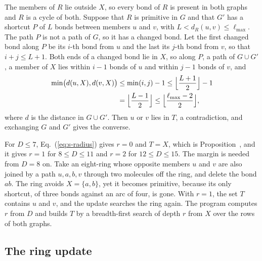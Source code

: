 \documentclass[preprint,12pt]{elsarticle}
\begin{document}
\begin{pf}
The members of $R$ lie outside $X$, so every bond of $R$ is present in both graphs and $R$ is a cycle of both.
Suppose that $R$ is primitive in $G$ and that $G'$ has a shortcut $P$ of $L$ bonds between members $u$ and $v$, with $L<d_R(u,v)\le\ell_{\max}$.
The path $P$ is not a path of $G$, so it has a changed bond.
Let the first changed bond along $P$ be its $i$-th bond from $u$ and the last its $j$-th bond from $v$, so that $i+j\le L+1$.
Both ends of a changed bond lie in $X$, so along $P$, a path of $G\cup G'$, a member of $X$ lies within $i-1$ bonds of $u$ and within $j-1$ bonds of $v$, and
\begin{equation*}
  \begin{aligned}
    \min\bigl(d(u,X),d(v,X)\bigr)&\le\min(i,j)-1\le\Bigl\lfloor\frac{L+1}{2}\Bigr\rfloor-1\\
    &=\Bigl\lfloor\frac{L-1}{2}\Bigr\rfloor\le\Bigl\lfloor\frac{\ell_{\max}-2}{2}\Bigr\rfloor,
  \end{aligned}
\end{equation*}
where $d$ is the distance in $G\cup G'$.
Then $u$ or $v$ lies in $T$, a contradiction, and exchanging $G$ and $G'$ gives the converse.
\end{pf}

For $D\le 7$, Eq.~(\ref{eq:s-radius}) gives $r=0$ and $T=X$, which is Proposition~, and it gives $r=1$ for $8\le D\le 11$ and $r=2$ for $12\le D\le 15$.
The margin is needed from $D=8$ on.
Take an eight-ring whose opposite members $u$ and $v$ are also joined by a path $u,a,b,v$ through two molecules off the ring, and delete the bond $ab$.
The ring avoids $X=\{a,b\}$, yet it becomes primitive, because its only shortcut, of three bonds against an arc of four, is gone.
With $r=1$, the set $T$ contains $u$ and $v$, and the update searches the ring again.
The program computes $r$ from $D$ and builds $T$ by a breadth-first search of depth $r$ from $X$ over the rows of both graphs.

\subsection{The ring update}
\label{sec:s-update}
\end{document}
